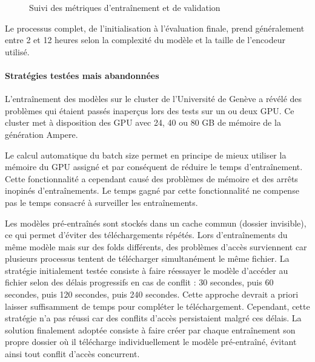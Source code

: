 \begin{figure}[H]
    \centering
    \caption{Suivi des métriques d'entraînement et de validation}
    \label{fig:ch36_entrainement_01_suivi_metriques}
\end{figure}

Le processus complet, de l'initialisation à l'évaluation finale, prend généralement entre 2 et 12 heures selon la complexité du modèle et la taille de l'encodeur utilisé.

\paragraph{Stratégies testées mais abandonnées}
L'entraînement des modèles sur le cluster de l'Université de Genève a révélé des problèmes qui étaient passés inaperçus lors des tests sur un ou deux GPU. Ce cluster met à disposition des GPU avec 24, 40 ou 80 GB de mémoire de la génération Ampere.

Le calcul automatique du batch size permet en principe de mieux utiliser la mémoire du GPU assigné et par conséquent de réduire le temps d'entraînement. Cette fonctionnalité a cependant causé des problèmes de mémoire et des arrêts inopinés d'entraînements. Le temps gagné par cette fonctionnalité ne compense pas le temps consacré à surveiller les entraînements.

Les modèles pré-entraînés sont stockés dans un cache commun (dossier invisible), ce qui permet d'éviter des téléchargements répétés. Lors d'entraînements du même modèle mais sur des folds différents, des problèmes d'accès surviennent car plusieurs processus tentent de télécharger simultanément le même fichier. La stratégie initialement testée consiste à faire réessayer le modèle d'accéder au fichier selon des délais progressifs en cas de conflit : 30 secondes, puis 60 secondes, puis 120 secondes, puis 240 secondes. Cette approche devrait a priori laisser suffisamment de temps pour compléter le téléchargement. Cependant, cette stratégie n'a pas réussi car des conflits d'accès persistaient malgré ces délais. La solution finalement adoptée consiste à faire créer par chaque entraînement son propre dossier où il télécharge individuellement le modèle pré-entraîné, évitant ainsi tout conflit d'accès concurrent.

